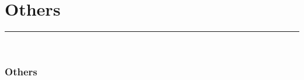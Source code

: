 \documentclass{article}
\begin{document}
\clearpage
\part{Others}
{\noindent}	 \rule[-10pt]{17.5cm}{0.5em}\\
\section{Others}











\end{document}

